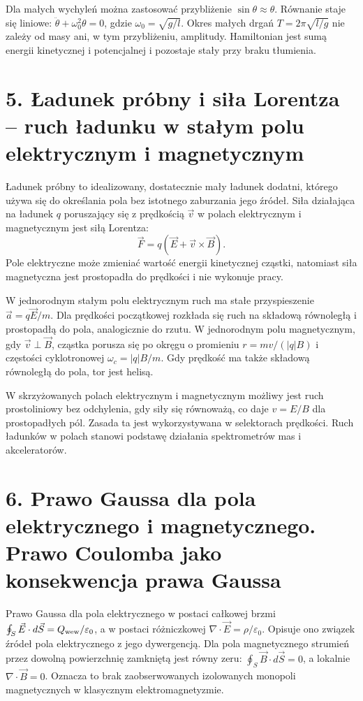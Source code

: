 \documentclass[11pt,a4paper,oneside]{report}
\begin{document}
Dla małych wychyleń można zastosować przybliżenie \(\sin\theta\approx\theta\). Równanie staje się liniowe: \(\ddot\theta+\omega_0^2\theta=0\), gdzie \(\omega_0=\sqrt{g/l}\). Okres małych drgań \(T=2\pi\sqrt{l/g}\) nie zależy od masy ani, w tym przybliżeniu, amplitudy. Hamiltonian jest sumą energii kinetycznej i potencjalnej i pozostaje stały przy braku tłumienia.

\section{5. Ładunek próbny i siła Lorentza – ruch ładunku w stałym polu elektrycznym i magnetycznym}
Ładunek próbny to idealizowany, dostatecznie mały ładunek dodatni, którego używa się do określania pola bez istotnego zaburzania jego źródeł. Siła działająca na ładunek \(q\) poruszający się z prędkością \(\vec v\) w polach elektrycznym i magnetycznym jest siłą Lorentza:
\[
\vec F=q(\vec E+\vec v\times\vec B).
\]
Pole elektryczne może zmieniać wartość energii kinetycznej cząstki, natomiast siła magnetyczna jest prostopadła do prędkości i nie wykonuje pracy.

W jednorodnym stałym polu elektrycznym ruch ma stałe przyspieszenie \(\vec a=q\vec E/m\). Dla prędkości początkowej rozkłada się ruch na składową równoległą i prostopadłą do pola, analogicznie do rzutu. W jednorodnym polu magnetycznym, gdy \(\vec v\perp\vec B\), cząstka porusza się po okręgu o promieniu \(r=mv/(|q|B)\) i częstości cyklotronowej \(\omega_c=|q|B/m\). Gdy prędkość ma także składową równoległą do pola, tor jest helisą.

W skrzyżowanych polach elektrycznym i magnetycznym możliwy jest ruch prostoliniowy bez odchylenia, gdy siły się równoważą, co daje \(v=E/B\) dla prostopadłych pól. Zasada ta jest wykorzystywana w selektorach prędkości. Ruch ładunków w polach stanowi podstawę działania spektrometrów mas i akceleratorów.

\section{6. Prawo Gaussa dla pola elektrycznego i magnetycznego. Prawo Coulomba jako konsekwencja prawa Gaussa}
Prawo Gaussa dla pola elektrycznego w postaci całkowej brzmi \(\oint_S\vec E\cdot d\vec S=Q_{\rm wew}/\varepsilon_0\), a w postaci różniczkowej \(\nabla\cdot\vec E=\rho/\varepsilon_0\). Opisuje ono związek źródeł pola elektrycznego z jego dywergencją. Dla pola magnetycznego strumień przez dowolną powierzchnię zamkniętą jest równy zeru: \(\oint_S\vec B\cdot d\vec S=0\), a lokalnie \(\nabla\cdot\vec B=0\). Oznacza to brak zaobserwowanych izolowanych monopoli magnetycznych w klasycznym elektromagnetyzmie.
\end{document}
